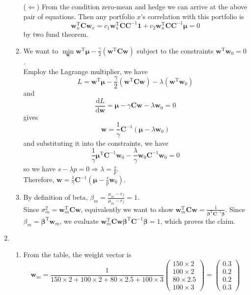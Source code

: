 \documentclass[12pt]{article}
\newcommand{\diff}{\mathrm{d}}
\theoremstyle{definition}
\begin{document}
\begin{enumerate}
\begin{enumerate}
    ($\Leftarrow$) From the condition zero-mean and hedge we can arrive at the above pair of equations. Then any portfolio $x$'s correlation with this portfolio is
    \[
\mathbf{w}_u^\text{T}\mathbf{C}\mathbf{w}_x = c_1\mathbf{w}_u^\text{T}\mathbf{C}\mathbf{C}^{-1}\mathbf{1}+c_2\mathbf{w}_u^\text{T}\mathbf{C}\mathbf{C}^{-1}\bm{\mu} = 0
    \] 
    by two fund theorem. 
    \item We want to $\min\limits_\mathbf{w} \mathbf{w}^\text{T}\bm{\mu}-\frac{\gamma}{2}(\mathbf{w}^\text{T}\mathbf{Cw})$ subject to the constraints $\mathbf{w}^\text{T}\mathbf{w}_0=0$.\\
    Employ the Lagrange multiplier, we have
    \[
L = \mathbf{w}^\text{T}\bm{\mu}-\frac{\gamma}{2}(\mathbf{w}^\text{T}\mathbf{Cw}) - \lambda(\mathbf{w}^\text{T}\mathbf{w}_0)
    \]
    and
    \[
\frac{\diff L}{\diff \mathbf{w}}=\bm{\mu}-\gamma\mathbf{Cw}-\lambda \mathbf{w}_0 = 0
    \]
    gives 
    \[
\mathbf{w} =\frac{1}{\gamma}\mathbf{C}^{-1} (\bm{\mu}-\lambda\mathbf{w}_0)
    \]
    and substituting it into the constraints, we have
    \[
\frac{1}{\gamma}\bm{\mu}^\text{T}\mathbf{C}^{-1}\mathbf{w}_0-\frac{\lambda}{\gamma}\mathbf{w}_0\mathbf{C}^{-1}\mathbf{w}_0=0
    \]
    so we have $s-\lambda p = 0\Rightarrow \lambda = \frac{s}{p}$.\\
    Therefore, $\mathbf{w} =\frac{1}{\gamma}\mathbf{C}^{-1} (\bm{\mu}-\frac{s}{p}\mathbf{w}_0)$.
    \item By definition of beta, $\beta_m = \frac{\mu_m-r_f}{\mu_m-r_f}=1$.\\
    Since $\sigma_m^2 = \mathbf{w}_m^\text{T}\mathbf{Cw}$, equivalently we want to show $\mathbf{w}_m^\text{T}\mathbf{Cw}=\frac{1}{\bm{\beta}^\text{T}\mathbf{C}^{-1}\bm{\beta}}$. Since $\beta_m = \bm{\beta}^\text{T}\mathbf{w}_m$, we evaluate $\mathbf{w}_m^\text{T}\mathbf{Cw}\bm{\beta}^\text{T}\mathbf{C}^{-1}\bm{\beta} = 1$, which proves the claim.
  \end{enumerate}
  \item \begin{enumerate}
    \item From the table, the weight vector is
    \[
\mathbf{w}_m=\frac{1}{150\times2+100\times 2+80\times2.5+100\times 3}\begin{pmatrix}150\times2\\100\times2\\80\times 2.5\\100\times 3\end{pmatrix}=\begin{pmatrix} 0.3\\0.2\\0.2\\0.3\end{pmatrix}
\]
\end{enumerate}
\end{enumerate}
\end{document}
